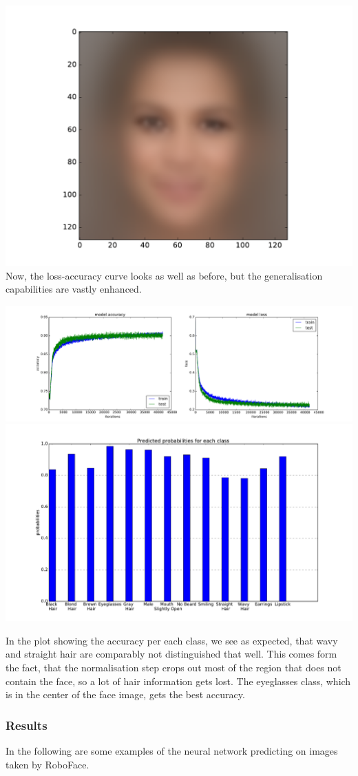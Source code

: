 \documentclass[12.5pt]{scrartcl}
\begin{document}
	\includegraphics[width=0.5\linewidth]{images/meanFace}\\
	Now, the loss-accuracy curve looks as well as before, but the generalisation capabilities are vastly enhanced.
	
	\includegraphics[width=\linewidth]{images/lossGood}\\
	\includegraphics[width=0.8\linewidth]{images/accuracy_on_classes}
	
	In the plot showing the accuracy per each class, we see as expected, that wavy and straight hair are comparably not distinguished that well. This comes form the fact, that the normalisation step crops out most of the region that does not contain the face, so a lot of hair information gets lost. The eyeglasses class, which is in the center of the face image, gets the best accuracy.
	
	\subsubsection{Results}
	In the following are some examples of the neural network predicting on images taken by RoboFace.
	
\end{document}
